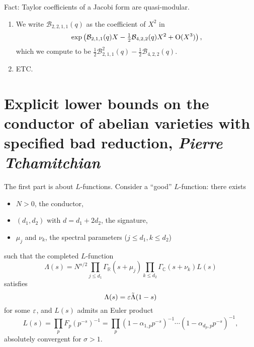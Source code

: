 \documentclass[reqno]{amsart} 
\begin{document}
Fact: Taylor coefficients of a Jacobi form are quasi-modular.

\begin{example}[$k=2=s+1, r=1$]
  \begin{enumerate}
  \item We write $\mathcal{B}_{2, 2, 1, 1}(q)$ as the coefficient of $X^2$ in
    \begin{equation*}
      \exp \left( \mathcal{B}_{2, 1, 1}(q) X - \tfrac{1}{2} \mathcal{B}_{4, 2, 2}(q) X^2 + \operatorname{O}(X^3) \right),
    \end{equation*}
    which we compute to be $\tfrac{1}{2} \mathcal{B}_{2, 1, 1}^2(q) - \tfrac{1}{2} \mathcal{B}_{4, 2, 2}(q)$.
  \item ETC.
  \end{enumerate}
\end{example}


\section{Explicit lower bounds on the conductor of abelian varieties with specified bad reduction, \textnormal{\emph{Pierre Tchamitchian}}}

The first part is about $L$-functions.  Consider a ``good'' $L$-function: there exists
\begin{itemize}
\item $N > 0$, the conductor, 
\item $(d_1, d_2)$ with $d = d_1 + 2 d_2$, the signature,
\item $\mu_j$ and $\nu_k$, the spectral parameters ($j \leq d_1, k \leq d_2$)
\end{itemize}
such that the completed $L$-function
\begin{equation*}
  \Lambda(s) = N^{s/2}
  \prod_{j \leq d_1}
  \Gamma_{\mathbb{R}}(s + \mu_j) \prod_{k \leq d_2} \Gamma_{\mathbb{C}}(s + \nu_k) L(s)
\end{equation*}
satisfies
\begin{equation*}
  \Lambda(s) = \varepsilon \tilde{\Lambda}(1 - s)
\end{equation*}
for some $\varepsilon$, and $L(s)$ admits an Euler product
\begin{equation*}
  L(s) = \prod_p F_p(p^{- s})^{-1}
  = \prod_p
  \left( 1 - \alpha_{1, p} p^{- s} \right)^{-1}
  \dotsb
  \left( 1 - \alpha_{d_p, p} p^{- s} \right)^{-1},
\end{equation*}
absolutely convergent for $\sigma > 1$.
\end{document}

